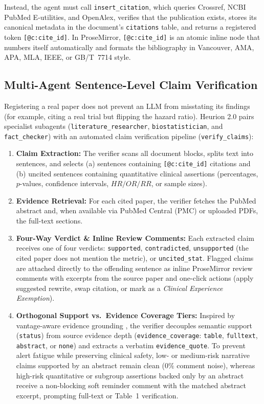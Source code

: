 \documentclass[11pt,a4paper]{article}
\begin{document}
Instead, the agent must call \texttt{insert\_citation}, which queries Crossref, NCBI PubMed E-utilities, and OpenAlex, verifies that the publication exists, stores its canonical metadata in the document's \texttt{citations} table, and returns a registered token \texttt{[@c:cite\_id]}. In ProseMirror, \texttt{[@c:cite\_id]} is an atomic inline node that numbers itself automatically and formats the bibliography in Vancouver, AMA, APA, MLA, IEEE, or GB/T~7714 style.

\subsection{Multi-Agent Sentence-Level Claim Verification}
Registering a real paper does not prevent an LLM from misstating its findings (for example, citing a real trial but flipping the hazard ratio). Heurion 2.0 pairs specialist subagents (\texttt{literature\_researcher}, \texttt{biostatistician}, and \texttt{fact\_checker}) with an automated claim verification pipeline (\texttt{verify\_claims}):

\begin{enumerate}[leftmargin=1.5em,itemsep=2pt]
  \item \textbf{Claim Extraction:} The verifier scans all document blocks, splits text into sentences, and selects (a) sentences containing \texttt{[@c:cite\_id]} citations and (b) uncited sentences containing quantitative clinical assertions (percentages, $p$-values, confidence intervals, $HR/OR/RR$, or sample sizes).
  \item \textbf{Evidence Retrieval:} For each cited paper, the verifier fetches the PubMed abstract and, when available via PubMed Central (PMC) or uploaded PDFs, the full-text sections.
  \item \textbf{Four-Way Verdict \& Inline Review Comments:} Each extracted claim receives one of four verdicts: \texttt{supported}, \texttt{contradicted}, \texttt{unsupported} (the cited paper does not mention the metric), or \texttt{uncited\_stat}. Flagged claims are attached directly to the offending sentence as inline ProseMirror review comments with excerpts from the source paper and one-click actions (apply suggested rewrite, swap citation, or mark as a \emph{Clinical Experience Exemption}).
  \item \textbf{Orthogonal Support vs.\ Evidence Coverage Tiers:} Inspired by vantage-aware evidence grounding \cite{safevantage2026}, the verifier decouples semantic support (\texttt{status}) from source evidence depth (\texttt{evidence\_coverage}: \texttt{table}, \texttt{fulltext}, \texttt{abstract}, or \texttt{none}) and extracts a verbatim \texttt{evidence\_quote}. To prevent alert fatigue while preserving clinical safety, low- or medium-risk narrative claims supported by an abstract remain clean ($0\%$ comment noise), whereas high-risk quantitative or subgroup assertions backed only by an abstract receive a non-blocking soft reminder comment with the matched abstract excerpt, prompting full-text or Table~1 verification.
\end{enumerate}
\end{document}
